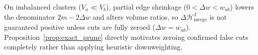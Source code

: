 \begin{remark}
On imbalanced clusters ($V_a \ll V_b$), partial edge shrinkage ($0 < \Delta w < w_{ab}$) lowers the denominator $2m - 2\Delta w$ and alters volume ratios, so $\Delta\mathcal{H}^2_{\text{merge}}$ is not guaranteed positive unless cuts are fully zeroed ($\Delta w = w_{ab}$). Proposition~\ref{prop:exact_prune} directly motivates zeroing confirmed false cuts completely rather than applying heuristic downweighting.
\end{remark}
